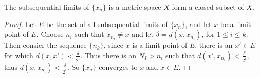 \begin{theorem}\label{3.2.3}
  The subsequential limits of $\{x_n\}$ is a metric space  $X$ form a closed subset of
  $X$.
\end{theorem}
\begin{proof}
  Let $E$ be the set of all subsequential limits of $\{x_n\}$, and let  $x$ be a limit point
  of  $E$. Choose $n_i$ such that $x_{n_i} \neq x$ and let  $\delta=d(x,x_{n_i})$, for
  $1 \leq i \leq k$. Then consier the sequence  $\{n_k\}$, since  $x$ is a limit point of  $E$,
  there is an  $x' \in E$ for which  $d(x,x')<\frac{\delta}{2^i}$. Thus there is an $N_I>n_i$
  such that $d(x',x_{n_i})<\frac{\delta}{2^i}$, thus $d(x,x_{n_i})<\frac{\delta}{2^i}$. So
  $\{x_n\}$ converges to  $x$ and  $x \in E$.
\end{proof}
